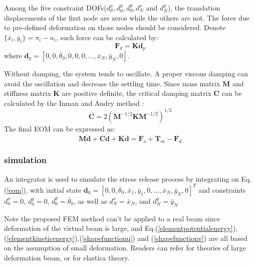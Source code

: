 \documentclass[conference, onecolumn]{IEEEtran}
\begin{document}
Among the five constraint DOFs($d^x_0,d^y_0,d^\theta_0,d^x_N$ and $d^y_N$), the translation displacements of the first node are zeros while the others are not. The force due to pre-defined deformation on those nodes should be considered. Denote $\{\bar{x}_i,\bar{y}_i\}=\pi_i-n_i$, such force can be calculated by:
\begin{equation}
	\boldsymbol{F}_d = \mathbf{K}\boldsymbol{d}_p
\end{equation}
where $\boldsymbol{d}_p = [0,0,\bar{\theta}_0,0,0,0,...,\bar{x}_N,\bar{y}_N,0]$. 

Without damping, the system tends to oscillate. A proper viscous damping can avoid the oscillation and decrease the settling time.
Since mass matrix $\mathbf{M}$ and stiffness matrix $\mathbf{K}$ are positive definite, the critical damping matrix $\mathbf{C}$ can be calculated by the Inman and Andry method \cite{Inman1980SomeRO}:
\begin{equation}	
    \mathbf{C}  = 2\left(\mathbf{M}^{-1/2}\mathbf{K}\mathbf{M}^{-1/2}\right)^{1/2}
	\label{criticaldamping}
\end{equation}
The final EOM can be expressed as:
\begin{equation}\label{eom}
	\mathbf{M}\ddot{\boldsymbol{d}}+ \mathbf{C}\dot{\boldsymbol{d}}+ \mathbf{K}\boldsymbol{d}= \boldsymbol{F}_o +\boldsymbol{T}_m -\boldsymbol{F}_d 
\end{equation}

\subsubsection{simulation}
An integrator is used to simulate the stress release process by integrating on Eq.(\ref{eom}), with initial state $\boldsymbol{d}_0 = [0,0,\bar{\theta}_0,\bar{x}_1,\bar{y}_1,0,...,\bar{x}_N,\bar{y}_N,0]^T$ and constraints $d^x_0=0$, $d^y_0=0$, $d^\theta_0=\bar{\theta}_0$, as well as $d^x_N=\bar{x}_N$, and $d^y_N=\bar{y}_N$

Note the proposed FEM method can't be applied to a real beam since deformation of the virtual beam is large, and Eq.(\ref{elementpotentialenergy}),(\ref{elementkineticenergy}),(\ref{shapefunctionu}) and (\ref{shapefunctionv}) are all based on the assumption of small deformation. Readers can refer \cite{largedeformationbeam} for theories of large deformation beam, or \cite{kim2021physicsinformed}\cite{Levien:EECS-2008-103} for elastica theory.
\end{document}
